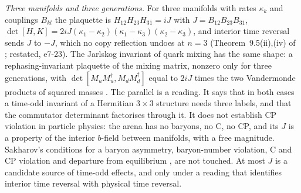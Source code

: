 \emph{Three manifolds and three generations.} For three manifolds with rates $\kappa_k$ and couplings $B_{kl}$ the plaquette is
$H_{12}H_{23}H_{31}=iJ$ with $J=B_{12}B_{23}B_{31}$, $\det[H,K]=2iJ(\kappa_1-\kappa_2)(\kappa_1-\kappa_3)(\kappa_2-\kappa_3)$, and interior time
reversal sends $J$ to $-J$, which no copy reflection undoes at $n=3$ (Theorem~9.5(ii),(iv) of \cite{RE}; restated, e7-23). The Jarlskog invariant of
quark mixing has the same shape: a rephasing-invariant plaquette of the mixing matrix, nonzero only for three generations, with
$\det[M_uM_u^\dagger,M_dM_d^\dagger]$ equal to $2iJ$ times the two Vandermonde products of squared masses \cite{Jarlskog85,KobayashiMaskawa73}. The
parallel is a reading. It says that in both cases a time-odd invariant of a Hermitian $3\times3$ structure needs three labels, and that the
commutator determinant factorises through it. It does not establish CP violation in particle physics: the arena has no baryons, no C, no
CP, and its $J$ is a property of the interior $b$-field between manifolds, with a free magnitude. Sakharov's conditions for a baryon asymmetry,
baryon-number violation, C and CP violation and departure from equilibrium \cite{Sakharov67}, are not touched. At most $J$ is a candidate source
of time-odd effects, and only under a reading that identifies interior time reversal with physical time reversal.

